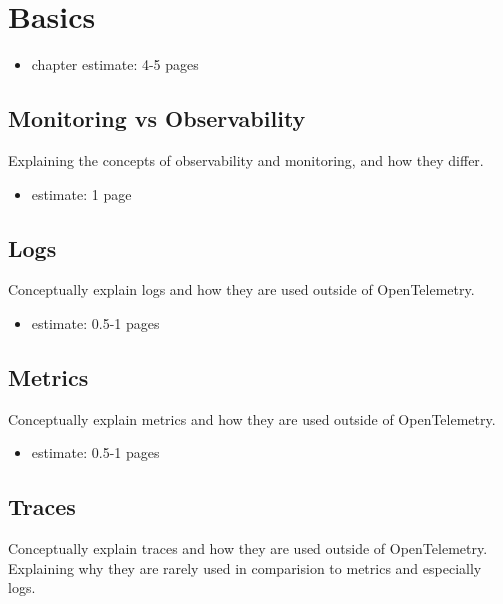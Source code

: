 \chapter{Basics}
\label{chap:basics}

\begin{itemize}
    \item chapter estimate: 4-5 pages
\end{itemize}

\section{Monitoring vs Observability}
\label{sec:b_monitoring_vs_observability}

Explaining the concepts of observability and monitoring, and how they differ.

\begin{itemize}
    \item estimate: 1 page
\end{itemize}


\section{Logs}
\label{sec_b_logs}

Conceptually explain logs and how they are used outside of OpenTelemetry.

\begin{itemize}
    \item estimate: 0.5-1 pages
\end{itemize}

\section{Metrics}
\label{sec_b_metrics}

Conceptually explain metrics and how they are used outside of OpenTelemetry.

\begin{itemize}
    \item estimate: 0.5-1 pages
\end{itemize}

\section{Traces}
\label{sec_b_traces}

Conceptually explain traces and how they are used outside of OpenTelemetry.
Explaining why they are rarely used in comparision to metrics and especially logs.

